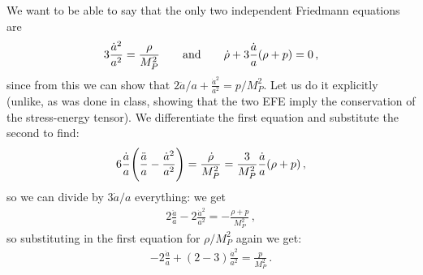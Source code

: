 \documentclass[main.tex]{subfiles}
\begin{document}
We want to be able to say that the only two independent Friedmann equations are 
%
\begin{align}
3\frac{\dot{a}^2}{a^2} = \frac{\rho }{M_P^2}
\qquad \text{and} \qquad
\dot{\rho} + 3 \frac{\dot{a}}{a} \qty(\rho + p) = 0
\,,
\end{align}
%
since from this we can show that \(2 \ddot{a} / a + \frac{\dot{a}^2}{a^2} = p / M_P^2\). Let us do it explicitly (unlike, as was done in class, showing that the two EFE imply the conservation of the stress-energy tensor). We differentiate the first equation and substitute the second to find: 
%
\begin{align}
6 \frac{\dot{a}}{a} \qty(\frac{\ddot{a}}{a } - \frac{\dot{a}^2}{a^2}) = \frac{\dot{\rho}}{M_P^2}
= \frac{3}{M_P^2} \frac{\dot{a}}{a} \qty(\rho +p)
\,,
\end{align}
%
so we can divide by \(3 \dot{a} / a\) everything: we get 
%
\begin{align}
2 \frac{\ddot{a}}{a} - 2 \frac{\dot{a}^2}{a^2} = -\frac{\rho +p}{M_P^2} 
\,,
\end{align}
%
so substituting in the first equation for \(\rho / M_P^2\) again we get: 
%
\begin{align}
-2 \frac{\ddot{a}}{a} + (2-3) \frac{\dot{a}^2}{a^2} = \frac{p}{M_P^2}
\,.
\end{align}
\end{document}
